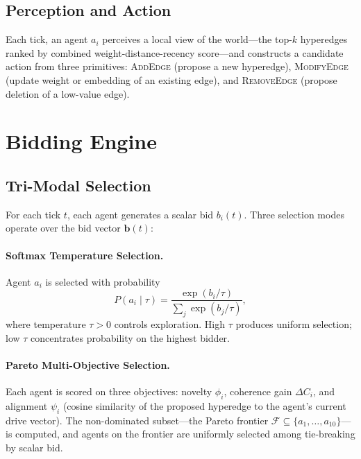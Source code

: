 \documentclass[11pt]{article}
\begin{document}
\subsection{Perception and Action}

Each tick, an agent $a_i$ perceives a local view of the world---the top-$k$
hyperedges ranked by combined weight-distance-recency score---and constructs a
candidate action from three primitives: \textsc{AddEdge} (propose a new
hyperedge), \textsc{ModifyEdge} (update weight or embedding of an existing edge),
and \textsc{RemoveEdge} (propose deletion of a low-value edge).

\section{Bidding Engine}
\label{sec:bidding}

\subsection{Tri-Modal Selection}

For each tick $t$, each agent generates a scalar bid $b_i(t)$. Three selection
modes operate over the bid vector $\mathbf{b}(t)$:

\paragraph{Softmax Temperature Selection.}
Agent $a_i$ is selected with probability
\begin{equation}
  P(a_i \mid \tau) = \frac{\exp(b_i / \tau)}{\sum_j \exp(b_j / \tau)},
  \label{eq:softmax}
\end{equation}
where temperature $\tau > 0$ controls exploration. High $\tau$ produces uniform
selection; low $\tau$ concentrates probability on the highest bidder.

\paragraph{Pareto Multi-Objective Selection.}
Each agent is scored on three objectives: novelty $\phi_i$, coherence gain
$\Delta C_i$, and alignment $\psi_i$ (cosine similarity of the proposed
hyperedge to the agent's current drive vector). The non-dominated subset---the
Pareto frontier $\mathcal{F} \subseteq \{a_1,\ldots,a_{10}\}$---is computed,
and agents on the frontier are uniformly selected among tie-breaking by
scalar bid.
\end{document}
